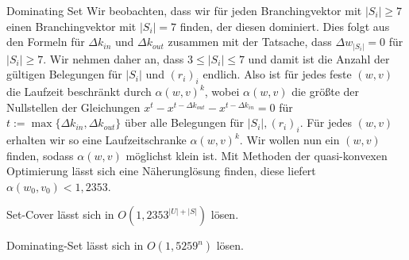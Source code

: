 \begin{section}{Dominating Set}
  Wir beobachten, dass wir für jeden Branchingvektor mit \(|S_i| \geq 7\) einen Branchingvektor mit \(|S_i| = 7\) finden, der diesen dominiert. Dies folgt aus den Formeln für \(\Delta k_{in}\) und \(\Delta k_{out}\) zusammen mit der Tatsache, dass \(\Delta w_{|S_i|} = 0\) für \(|S_i| \geq 7\). Wir nehmen daher an, dass \(3 \leq |S_i| \leq 7\) und damit ist die Anzahl der gültigen Belegungen für \(|S_i|\) und \((r_i)_i\) endlich. Also ist für jedes feste \((w,v)\) die Laufzeit beschränkt durch \(\alpha(w,v)^k\), wobei \(\alpha(w,v)\) die größte der Nullstellen der Gleichungen \(x^t - x^{t-\Delta k_{out}} - x^{t - \Delta k_{in}} = 0\) für \(t := \max \{ \Delta k_{in}, \Delta k_{out} \}\) über alle Belegungen für \(|S_i|,(r_i)_i\). Für jedes \((w,v)\) erhalten wir so eine Laufzeitschranke \(\alpha(w,v)^k\). Wir wollen nun ein \((w,v)\) finden, sodass \(\alpha(w,v)\) möglichst klein ist. Mit Methoden der quasi-konvexen Optimierung lässt sich eine Näherunglösung finden, diese liefert \(\alpha(w_0,v_0) < 1,2353\).

  \begin{theorem}
    Set-Cover lässt sich in \(O(1,2353^{|U|+|S|})\) lösen.
  \end{theorem}

  \begin{corollary}
    Dominating-Set lässt sich in \(O(1,5259^n)\) lösen.
  \end{corollary}
\end{section}